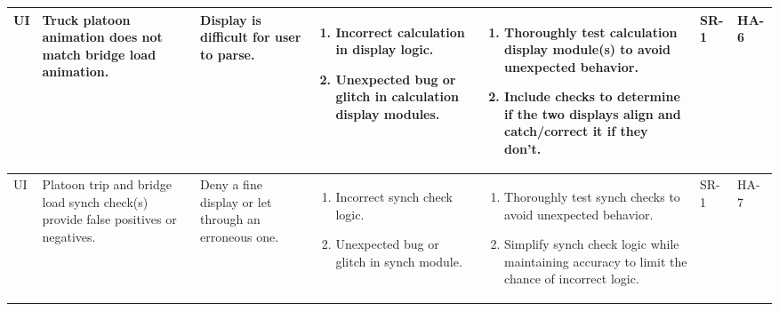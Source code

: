\documentclass{article}
\begin{document}
\begin{landscape}
\begin{longtable}{|p{} | p{} | p{} | p{} | p{} | p{} | p{}|}
  UI & Truck platoon animation does not match bridge load animation. &
  Display is difficult for user to parse. &
  \begin{enumerate}[leftmargin=*, label={\alph*.}, itemsep=1pt, topsep=0pt, partopsep=0pt] 
    \item Incorrect calculation in display logic.
    \item Unexpected bug or glitch in calculation display modules.
  \end{enumerate} &
  \begin{enumerate}[leftmargin=*, label={\alph*.}, itemsep=1pt, topsep=0pt, partopsep=0pt] 
    \item Thoroughly test calculation display module(s) to avoid unexpected behavior.
    \item Include checks to determine if the two displays align and catch/correct it if they don’t.
  \end{enumerate} &
  SR-1 & HA-6 \\

  \hline

  UI & Platoon trip and bridge load synch check(s) provide false positives or negatives. & 
  Deny a fine display or let through an erroneous one. & 
  \begin{enumerate}[leftmargin=*, label={\alph*.}, itemsep=1pt, topsep=0pt, partopsep=0pt] 
    \item Incorrect synch check logic.
    \item Unexpected bug or glitch in synch module.
  \end{enumerate} & 
  \begin{enumerate}[leftmargin=*, label={\alph*.}, itemsep=1pt, topsep=0pt, partopsep=0pt] 
    \item Thoroughly test synch checks to avoid unexpected behavior.
    \item Simplify synch check logic while maintaining accuracy to limit the chance of incorrect logic.
  \end{enumerate} &
  SR-1 & HA-7 \\

  \hline
  

\end{longtable}
\end{landscape}
\end{document}
